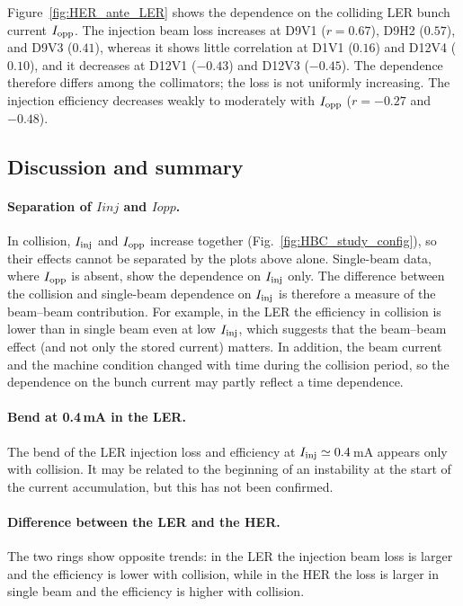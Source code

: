 Figure~\ref{fig:HER_ante_LER} shows the dependence on the colliding LER bunch current $I_{\mathrm{opp}}$.
The injection beam loss increases at D9V1 ($r = 0.67$), D9H2 ($0.57$), and D9V3 ($0.41$),
whereas it shows little correlation at D1V1 ($0.16$) and D12V4 ($0.10$), and it decreases at D12V1 ($-0.43$) and D12V3 ($-0.45$).
The dependence therefore differs among the collimators; the loss is not uniformly increasing.
The injection efficiency decreases weakly to moderately with $I_{\mathrm{opp}}$ ($r = -0.27$ and $-0.48$).


\subsection{Discussion and summary}

\paragraph{Separation of $Iinj$ and $Iopp$.}
In collision, $I_{\mathrm{inj}}$ and $I_{\mathrm{opp}}$ increase together (Fig.~\ref{fig:HBC_study_config}), so their effects cannot be separated by the plots above alone.
Single-beam data, where $I_{\mathrm{opp}}$ is absent, show the dependence on $I_{\mathrm{inj}}$ only.
The difference between the collision and single-beam dependence on $I_{\mathrm{inj}}$ is therefore a measure of the beam--beam contribution.
For example, in the LER the efficiency in collision is lower than in single beam even at low $I_{\mathrm{inj}}$, which suggests that the beam--beam effect (and not only the stored current) matters.
In addition, the beam current and the machine condition changed with time during the collision period,
so the dependence on the bunch current may partly reflect a time dependence.

\paragraph{Bend at 0.4\,mA in the LER.}
The bend of the LER injection loss and efficiency at $I_{\mathrm{inj}} \simeq 0.4$\,mA appears only with collision.
It may be related to the beginning of an instability at the start of the current accumulation, but this has not been confirmed.

\paragraph{Difference between the LER and the HER.}
The two rings show opposite trends: in the LER the injection beam loss is larger and the efficiency is lower with collision,
while in the HER the loss is larger in single beam and the efficiency is higher with collision.

